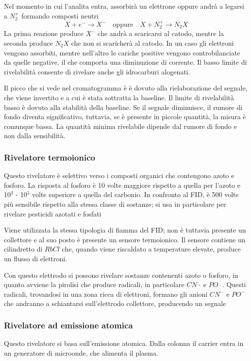 Nel momento in cui l'analita entra, assorbirà un elettrone oppure andrà a legarsi a $N_2^+$ formando composti neutri
\[
X + e^- \rightarrow X^- \quad \text{oppure} \quad X + N_2^+ \rightarrow N_2X
\]
La prima reazione produce $X^-$ che andrà a scaricarsi al catodo, mentre la seconda produce $N_2X$ che non si scaricherà al catodo. In un caso gli elettroni vengono assorbiti, mentre nell'altro le cariche positive vengono controbilanciate da quelle negative, il che comporta una diminuzione di corrente. Il basso limite di rivelabilità consente di rivelare anche gli idrocarburi alogenati.

Il picco che si vede nel cromatogramma è è dovuto alla rielaborazione del segnale, che viene invertito e a cui è stata sottratta la baseline. Il limite di rivelabilità basso è dovuto alla stabilità della baseline. Se il segnale diminuisce, il rumore di fondo diventa significativo, tuttavia, se è presente in piccole quantità, la misura è comunque bassa. La quantità minima rivelabile dipende dal rumore di fondo e non dalla sensibilità.

\subsubsection{Rivelatore termoionico}

Questo rivelatore è selettivo verso i composti organici che contengono azoto e fosforo. La risposta al fosforo è 10 volte maggiore rispetto a quella per l'azoto e 10$^3$ - 10$^5$ volte superiore a quella del carbonio. In confronto al FID, è 500 volte più sensibile rispetto alla stessa classe di sostanze; si usa in particolare per rivelare pesticidi azotati e fosfati


Viene utilizzata la stessa tipologia di fiamma del FID; non è tuttavia presente un collettore e al suo posto è presente un sensore termoionico. Il sensore contiene un cilindretto di $RbCl$ che, quando viene riscaldato a temperature elevate, produce un flusso di elettroni.

Con questo elettrodo si possono rivelare sostanze contenenti azoto o fosforo, in quanto avviene la pirolisi che produce radicali, in particolare $CN\cdot$ e $PO\cdot$. Questi radicali, trovandosi in una zona ricca di elettroni, formano gli anioni $CN^-$ e $PO^-$ che andranno a schiantarsi sull'elettrodo collettore, producendo un segnale

\subsubsection{Rivelatore ad emissione atomica}
Questo rivelatore si basa sull'emissione atomica. Dalla colonna il carrier entra in un generatore di microonde, che alimenta il plasma.

